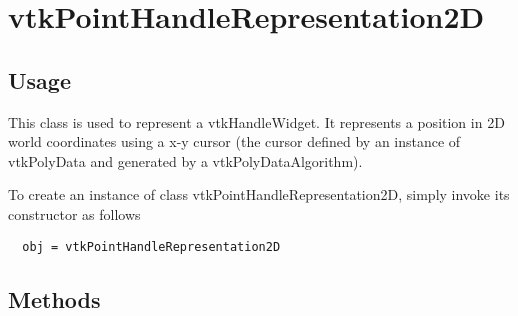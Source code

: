 \section{vtkPointHandleRepresentation2D}

\subsection{Usage}

 This class is used to represent a vtkHandleWidget. It represents a
 position in 2D world coordinates using a x-y cursor (the cursor defined by
 an instance of vtkPolyData and generated by a vtkPolyDataAlgorithm).

To create an instance of class vtkPointHandleRepresentation2D, simply
invoke its constructor as follows
\begin{verbatim}
  obj = vtkPointHandleRepresentation2D
\end{verbatim}
\subsection{Methods}

